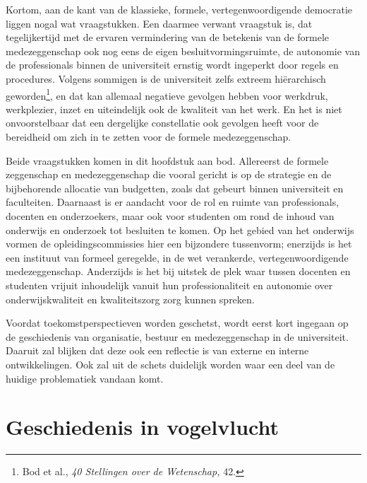 \documentclass[smallauthor, chapterhaspagenum, nochapterinheader, pagenuminheader,  bigchapnum,medium2, tocpages, garamond, titleinheader]{jote-book}
\begin{document}
	Kortom, aan de kant van de klassieke, formele, vertegenwoordigende democratie liggen nogal wat vraagstukken. Een daarmee verwant vraagstuk is, dat tegelijkertijd met de ervaren vermindering van de betekenis van de formele medezeggenschap ook nog eens de eigen besluitvormingsruimte, de autonomie van de professionals binnen de universiteit ernstig wordt ingeperkt door regels en procedures. Volgens sommigen is de universiteit zelfs extreem hiërarchisch geworden\footnote{Bod et al., \emph{40 Stellingen over de Wetenschap}\emph{, }42.}, en dat kan allemaal negatieve gevolgen hebben voor werkdruk, werkplezier, inzet en uiteindelijk ook de kwaliteit van het werk. En het is niet onvoorstelbaar dat een dergelijke constellatie ook gevolgen heeft voor de bereidheid om zich in te zetten voor de formele medezeggenschap.



	Beide vraagstukken komen in dit hoofdstuk aan bod. Allereerst de formele zeggenschap en medezeggenschap die vooral gericht is op de strategie en de bijbehorende allocatie van budgetten, zoals dat gebeurt binnen universiteit en faculteiten. Daarnaast is er aandacht voor de rol en ruimte van professionals, docenten en onderzoekers, maar ook voor studenten om rond de inhoud van onderwijs en onderzoek tot besluiten te komen. Op het gebied van het onderwijs vormen de opleidingscommissies hier een bijzondere tussenvorm; enerzijds is het een instituut van formeel geregelde, in de wet verankerde, vertegenwoordigende medezeggenschap. Anderzijds is het bij uitstek de plek waar tussen docenten en studenten vrijuit inhoudelijk vanuit hun professionaliteit en autonomie over onderwijskwaliteit en kwaliteitszorg zorg kunnen spreken.



	Voordat toekomstperspectieven worden geschetst, wordt eerst kort ingegaan op de geschiedenis van organisatie, bestuur en medezeggenschap in de universiteit. Daaruit zal blijken dat deze ook een reflectie is van externe en interne ontwikkelingen. Ook zal uit de schets duidelijk worden waar een deel van de huidige problematiek vandaan komt.

	\enlargethispage{\baselineskip}\checkandfixthelayout

	\section{Geschiedenis in vogelvlucht}
\end{document}
